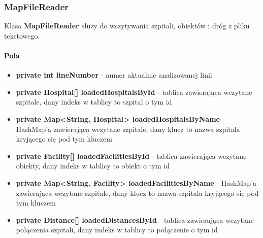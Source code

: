 \documentclass[]{article}
\begin{document}
            \subsubsection{MapFileReader}
                Klasa \textbf{MapFileReader} służy do wczytywania szpitali, obiektów i dróg z pliku tekstowego.
                
                \paragraph{Pola}
                    \begin{itemize}
                        \item \textbf{private int lineNumber} - numer aktualnie analizowanej linii
                        \item \textbf{private Hospital[] loadedHospitalsById} - tablica zawierająca wczytane szpitale, dany indeks w tablicy to szpital o tym id
                        \item \textbf{private Map<String, Hospital> loadedHospitalsByName} - HashMap'a zawierająca wczytane szpitale, dany klucz to nazwa szpitala kryjącego się pod tym kluczem
                        \item \textbf{private Facility[] loadedFacilitiesById} - tablica zawierająca wczytane obiekty, dany indeks w tablicy to obiekt o tym id
                        \item \textbf{private Map<String, Facility> loadedFacilitiesByName} - HashMap'a zawierająca wczytane szpitale, dany klucz to nazwa szpitala kryjącego się pod tym kluczem
                        \item \textbf{private Distance[] loadedDistancesById} - tablica zawierająca wczytane połączenia szpitali, dany indeks w tablicy to połączenie o tym id
                    \end{itemize}
                
\end{document}
